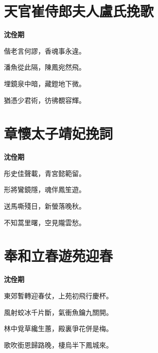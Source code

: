 \documentclass[12pt,a4paper]{ctexbook}
\begin{document}
\section{天官崔侍郎夫人盧氏挽歌}
\textbf{沈佺期}\par\vspace{0.5em}
偕老言何謬，香魂事永違。\par
潘魚從此隔，陳鳳宛然飛。\par
埋鏡泉中暗，藏鐙地下微。\par
猶憑少君術，彷彿覩容輝。\par

\section{章懷太子靖妃挽詞}
\textbf{沈佺期}\par\vspace{0.5em}
彤史佳聲載，青宮懿範留。\par
形將鸞鏡隱，魂伴鳳笙遊。\par
送馬嘶殘日，新螢落晚秋。\par
不知蒿里曙，空見隴雲愁。\par

\section{奉和立春遊苑迎春}
\textbf{沈佺期}\par\vspace{0.5em}
東郊暫轉迎春仗，上苑初飛行慶杯。\par
風射蛟冰千片斷，氣衝魚鑰九關開。\par
林中覓草纔生蕙，殿裏爭花併是梅。\par
歌吹銜恩歸路晚，棲烏半下鳳城來。\par
\end{document}
